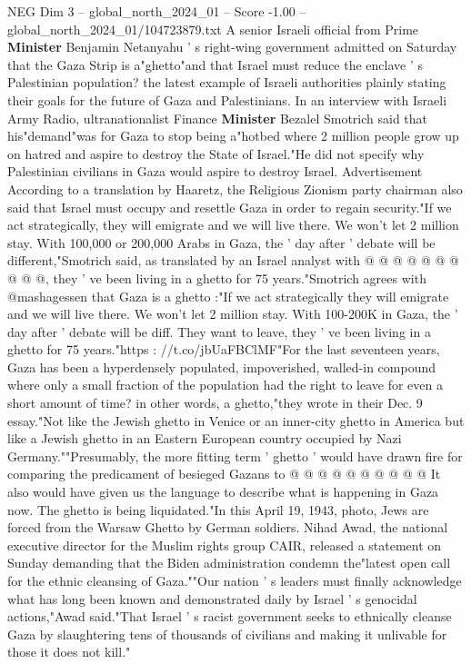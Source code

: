 \begin{textsample}{NEG Dim 3 – global\_north\_2024\_01 – Score -1.00 – global\_north\_2024\_01/104723879.txt}  \label{ex:f3_neg_214}
A senior Israeli official from Prime \textbf{Minister} Benjamin Netanyahu ' s right-wing government admitted on Saturday that the Gaza Strip is a"ghetto"and that Israel must reduce the enclave ' s Palestinian population? the latest example of Israeli authorities plainly stating their goals for the future of Gaza and Palestinians.
In an interview with Israeli Army Radio, ultranationalist Finance \textbf{Minister} Bezalel Smotrich said that his"demand"was for Gaza to stop being a"hotbed where 2 million people grow up on hatred and aspire to destroy the State of Israel."He did not specify why Palestinian civilians in Gaza would aspire to destroy Israel.
Advertisement According to a translation by Haaretz, the Religious Zionism party chairman also said that Israel must occupy and resettle Gaza in order to regain security."If we act strategically, they will emigrate and we will live there.
We won't let 2 million stay.
With 100,000 or 200,000 Arabs in Gaza, the ' day after ' debate will be different,"Smotrich said, as translated by an Israel analyst with @ @ @ @ @ @ @ @ @ @, they ' ve been living in a ghetto for 75 years."Smotrich agrees with @mashagessen that Gaza is a ghetto :"If we act strategically they will emigrate and we will live there.
We won't let 2 million stay.
With 100-200K in Gaza, the ' day after ' debate will be diff.
They want to leave, they ' ve been living in a ghetto for 75 years."https : //t.co/jbUaFBClMF"For the last seventeen years, Gaza has been a hyperdensely populated, impoverished, walled-in compound where only a small fraction of the population had the right to leave for even a short amount of time? in other words, a ghetto,"they wrote in their Dec. 9 essay."Not like the Jewish ghetto in Venice or an inner-city ghetto in America but like a Jewish ghetto in an Eastern European country occupied by Nazi Germany.""Presumably, the more fitting term ' ghetto ' would have drawn fire for comparing the predicament of besieged Gazans to @ @ @ @ @ @ @ @ @ @ It also would have given us the language to describe what is happening in Gaza now.
The ghetto is being liquidated."In this April 19, 1943, photo, Jews are forced from the Warsaw Ghetto by German soldiers.
Nihad Awad, the national executive director for the Muslim rights group CAIR, released a statement on Sunday demanding that the Biden administration condemn the"latest open call for the ethnic cleansing of Gaza.""Our nation ' s leaders must finally acknowledge what has long been known and demonstrated daily by Israel ' s genocidal actions,"Awad said."That Israel ' s racist government seeks to ethnically cleanse Gaza by slaughtering tens of thousands of civilians and making it unlivable for those it does not kill."

\end{textsample}
